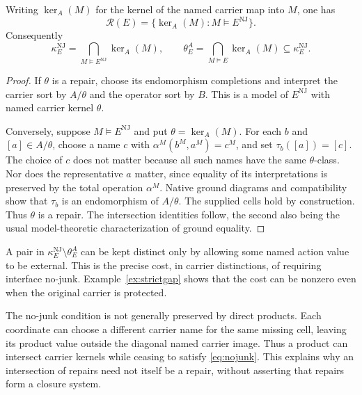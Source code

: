 \begin{theorem}\label{thm:nojunk}
Writing $\ker_A(M)$ for the kernel of the named carrier map into $M$, one has
\begin{equation}\label{eq:repairmodels}
\mathcal R(E)=\{\ker_A(M):M\models E^{\mathrm{NJ}}\}.
\end{equation}
Consequently
\[
\kappa_E^{\mathrm{NJ}}
=\bigcap_{M\models E^{\mathrm{NJ}}}\ker_A(M),
\qquad
\theta_E^A=\bigcap_{M\models E}\ker_A(M)
\subseteq\kappa_E^{\mathrm{NJ}}.
\]
\end{theorem}

\begin{proof}
If $\theta$ is a repair, choose its endomorphism completions and interpret
the carrier sort by $A/\theta$ and the operator sort by $B$. This is a model
of $E^{\mathrm{NJ}}$ with named carrier kernel $\theta$.

Conversely, suppose $M\models E^{\mathrm{NJ}}$ and put
$\theta=\ker_A(M)$. For each $b$ and $[a]\in A/\theta$, choose a name $c$
with $\alpha^M(b^M,a^M)=c^M$, and set $\tau_b([a])=[c]$.
The choice of $c$ does not matter because all such names have the same
$\theta$-class. Nor does the representative $a$ matter, since equality of
its interpretations is preserved by the total operation $\alpha^M$.
Native ground diagrams and compatibility show that $\tau_b$ is an
endomorphism of $A/\theta$. The supplied cells hold by construction.
Thus $\theta$ is a repair. The intersection identities follow, the second
also being the usual model-theoretic characterization of ground equality.
\end{proof}

A pair in $\kappa_E^{\mathrm{NJ}}\setminus\theta_E^A$ can be kept distinct
only by allowing some named action value to be external. This is the
precise cost, in carrier distinctions, of requiring interface no-junk.
Example~\ref{ex:strictgap} shows that the cost can be nonzero even when the
original carrier is protected.

The no-junk condition is not generally preserved by direct products.
Each coordinate can choose a different carrier name for the same missing
cell, leaving its product value outside the diagonal named carrier image.
Thus a product can intersect carrier kernels while ceasing to satisfy
\eqref{eq:nojunk}. This explains why an intersection of repairs need not
itself be a repair, without asserting that repairs form a closure system.
